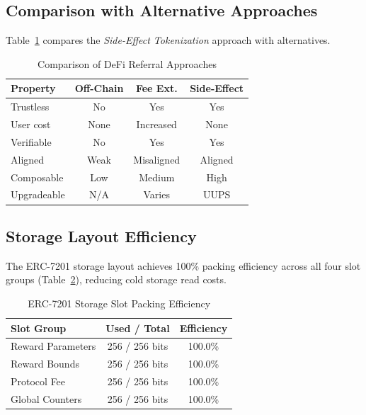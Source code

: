 \documentclass[conference]{IEEEtran}
\begin{document}
\subsection{Comparison with Alternative Approaches}

Table~\ref{tab:comparison} compares the \textit{Side-Effect Tokenization} approach with alternatives.

\begin{table}[t]
\caption{Comparison of DeFi Referral Approaches}
\label{tab:comparison}
\centering
\footnotesize
\begin{tabular}{lccc}
\toprule
\textbf{Property} & \textbf{Off-Chain} & \textbf{Fee Ext.} & \textbf{Side-Effect} \\
\midrule
Trustless & No & Yes & Yes \\
User cost & None & Increased & None \\
Verifiable & No & Yes & Yes \\
Aligned & Weak & Misaligned & Aligned \\
Composable & Low & Medium & High \\
Upgradeable & N/A & Varies & UUPS \\
\bottomrule
\end{tabular}
\end{table}

\subsection{Storage Layout Efficiency}

The ERC-7201 storage layout achieves 100\% packing efficiency across all four slot groups (Table~\ref{tab:storage}), reducing cold storage read costs.

\begin{table}[t]
\caption{ERC-7201 Storage Slot Packing Efficiency}
\label{tab:storage}
\centering
\footnotesize
\begin{tabular}{lcc}
\toprule
\textbf{Slot Group} & \textbf{Used / Total} & \textbf{Efficiency} \\
\midrule
Reward Parameters & 256 / 256 bits & 100.0\% \\
Reward Bounds & 256 / 256 bits & 100.0\% \\
Protocol Fee & 256 / 256 bits & 100.0\% \\
Global Counters & 256 / 256 bits & 100.0\% \\
\bottomrule
\end{tabular}
\end{table}
\end{document}
